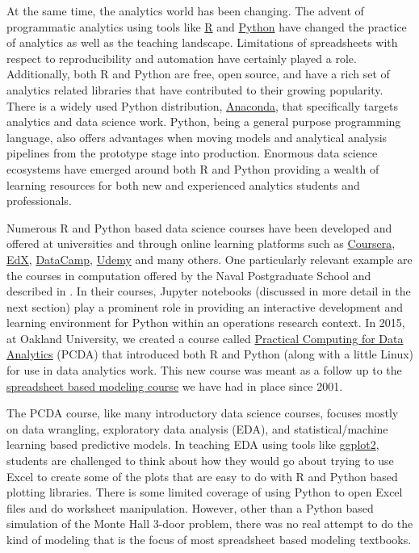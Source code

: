 \documentclass[ited,blindrev]{informs3}              %
\begin{document}
At the same time, the analytics world has been changing. The advent of programmatic analytics using tools like \href{https://www.r-project.org/}{R} and \href{https://www.python.org/}{Python} have changed the practice of analytics as well as the teaching landscape. Limitations of spreadsheets with respect to reproducibility and automation have certainly played a role.  Additionally, both R and Python are free, open source, and have a rich set of analytics related libraries that have contributed to their growing popularity. There is a widely used Python distribution, \href{https://www.anaconda.com/download}{Anaconda}, that specifically targets analytics and data science work. Python, being a general purpose programming language, also offers advantages when moving models and analytical analysis pipelines from the prototype stage into production. Enormous data science ecosystems have emerged around both R and Python providing a wealth of learning resources for both new and experienced analytics students and professionals.

Numerous R and Python based data science courses have been developed and offered at universities and through online learning platforms such as \href{https://www.coursera.org/browse/data-science}{Coursera}, \href{https://www.edx.org/learn/data-science}{EdX}, \href{https://www.datacamp.com/}{DataCamp}, \href{https://www.udemy.com/topic/data-analysis/}{Udemy} and many others. One particularly relevant example are the courses in computation offered by the Naval Postgraduate School and described in \citet{alderson2022:interactive_computing}. In their courses, Jupyter notebooks (discussed in more detail in the next section) play a prominent role in providing an interactive development and learning environment for Python within an operations research context. 
In 2015, at Oakland University, we created a course called \href{http://www.sba.oakland.edu/faculty/isken/courses/pcda/}{Practical Computing for Data Analytics} (PCDA) that introduced both R and Python (along with a little Linux) for use in data analytics work. This new course was meant as a follow up to the \href{http://www.sba.oakland.edu/faculty/isken/courses/ba/}{spreadsheet based modeling course} we have had in place since 2001.

The PCDA course, like many introductory data science courses, focuses mostly on data wrangling, exploratory data analysis (EDA), and statistical/machine learning based predictive models. In teaching EDA using tools like \href{https://ggplot2.tidyverse.org/}{ggplot2}, students are challenged to think about how they would go about trying to use Excel to create some of the plots that are easy to do with R and Python based plotting libraries. There is some limited coverage of using Python to open Excel files and do worksheet manipulation. However, other than a Python based simulation of the Monte Hall 3-door problem, there was no real attempt to do the kind of modeling that is the focus of most spreadsheet based modeling textbooks. 
\end{document}
